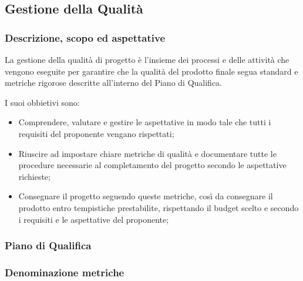 \pagebreak %
\subsection{Gestione della Qualità}

\subsubsection{Descrizione, scopo ed aspettative}
La gestione della qualità di progetto è l'insieme dei processi e delle attività che vengono eseguite per garantire che la qualità del prodotto finale 
segua standard e metriche rigorose descritte all'interno del Piano di Qualifica.

I suoi obbietivi sono:
\begin{itemize}
    \item Comprendere, valutare e gestire le aspettative in modo tale che tutti i requisiti del proponente vengano rispettati;
    \item Riuscire ad impostare chiare metriche di qualità e documentare tutte le procedure necessarie al completamento del progetto secondo le aspettative richieste;
    \item Consegnare il progetto seguendo queste metriche, così da consegnare il prodotto entro tempistiche prestabilite, rispettando il budget scelto e secondo i requisiti e le aspettative del proponente;
\end{itemize}
\subsubsection{Piano di Qualifica}

\subsubsection{Denominazione metriche}